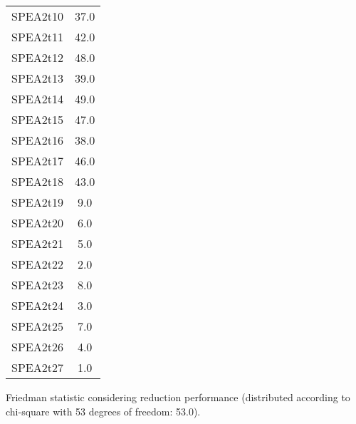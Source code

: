 \documentclass{article}
\begin{document}
\begin{table}[!htp]
\begin{tabular}{c|c}
SPEA2t10&37.0\\
SPEA2t11&42.0\\
SPEA2t12&48.0\\
SPEA2t13&39.0\\
SPEA2t14&49.0\\
SPEA2t15&47.0\\
SPEA2t16&38.0\\
SPEA2t17&46.0\\
SPEA2t18&43.0\\
SPEA2t19&9.0\\
SPEA2t20&6.0\\
SPEA2t21&5.0\\
SPEA2t22&2.0\\
SPEA2t23&8.0\\
SPEA2t24&3.0\\
SPEA2t25&7.0\\
SPEA2t26&4.0\\
SPEA2t27&1.0\\
\end{tabular}
\end{table}


Friedman statistic considering reduction performance (distributed according to chi-square with 53 degrees of freedom: 53.0).
\end{document}
